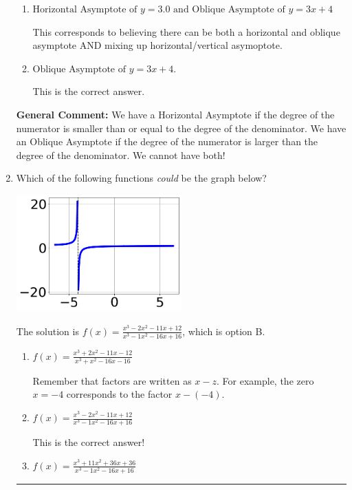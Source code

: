 \documentclass{extbook}[14pt]
\newcommand{\litem}[1]{\item #1

\rule{\textwidth}{0.4pt}}
\begin{document}
\begin{enumerate}
{\begin{enumerate}[label=\Alph*.]
This corresponds to using rule for Horizontal Asymptote when degree of numerator and denominator match.
\item \( \text{Horizontal Asymptote of } y = 3.0 \text{ and Oblique Asymptote of } y = 3x + 4 \)

This corresponds to believing there can be both a horizontal and oblique asymptote AND mixing up horizontal/vertical asymoptote.
\item \( \text{Oblique Asymptote of } y = 3x + 4. \)

This is the correct answer.
\end{enumerate}

\textbf{General Comment:} We have a Horizontal Asymptote if the degree of the numerator is smaller than or equal to the degree of the denominator. We have an Oblique Asymptote if the degree of the numerator is larger than the degree of the denominator. We cannot have both!
}
\litem{
Which of the following functions \textit{could} be the graph below?

\begin{center}
    \includegraphics[width=0.5\textwidth]{../Figures/identifyGraphOfRationalFunctionA.png}
\end{center}




The solution is \( f(x)=\frac{x^{3} -2 x^{2} -11 x + 12}{x^{3} -1 x^{2} -16 x + 16} \), which is option B.\begin{enumerate}[label=\Alph*.]
\item \( f(x)=\frac{x^{3} +2 x^{2} -11 x -12}{x^{3} + x^{2} -16 x -16} \)

Remember that factors are written as $x-z$. For example, the zero $x=-4$ corresponds to the factor $x-(-4)$.
\item \( f(x)=\frac{x^{3} -2 x^{2} -11 x + 12}{x^{3} -1 x^{2} -16 x + 16} \)

This is the correct answer!
\item \( f(x)=\frac{x^{3} +11 x^{2} +36 x + 36}{x^{3} -1 x^{2} -16 x + 16} \)


\end{enumerate}}
\end{enumerate}
\end{document}
